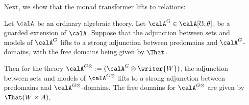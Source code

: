 Next, we show that the monad transformer lifts to relations:
\begin{lemma}\label{lem:writer-monad-transformer-free-domains}
    Let $\calA$ be an ordinary algebraic theory. Let $\calA^G \in \calA[\mho,
    \theta]$, be a guarded extension of $\calA$. Suppose that the adjunction
    between sets and models of $\calA^G$ lifts to a strong adjunction between
    predomains and $\calA^G$-domains, with the free domains being given by
    $\That$.
    
    Then for the theory $\calA^{G\otimes} := (\calA^{G} \otimes \writer{W})$, the
    adjunction between sets and models of $\calA^{G\otimes}$ lifts to a strong
    adjunction between predomains and $\calA^{G\otimes}$-domains.
    The free domains for $\calA^{G\otimes}$ are given by $\That(W \times A)$.
\end{lemma}
